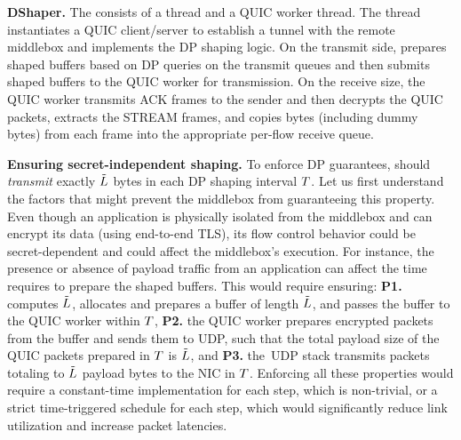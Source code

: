 \textbf{DShaper.}
%
The {\dshaper} consists of a {\prepare} thread and a QUIC
worker thread.
The {\prepare} thread instantiates a QUIC client/server to establish
a tunnel with the remote middlebox and implements the DP shaping logic.
On the transmit side, {\prepare} {prepares shaped buffers based on DP
queries on the transmit queues}
and then submits shaped buffers to the QUIC worker for transmission.
On the receive size, the QUIC worker transmits ACK frames to the sender
and then decrypts the QUIC packets, extracts the STREAM frames, and copies
bytes (including dummy bytes) from each frame into the appropriate per-flow
receive queue.

\textbf{Ensuring secret-independent shaping.}
To enforce DP guarantees, {\dshaper} should {\em transmit} exactly $\tilde{L}$
bytes in each DP shaping interval $T$.
%
Let us first understand the factors that might prevent the middlebox from
guaranteeing this property.
Even though an application is physically isolated from the middlebox and can
encrypt its data (\eg using end-to-end TLS), its flow control behavior could be
secret-dependent and could affect the middlebox's execution.
For instance, the presence or absence of payload traffic from an application
can affect the time {\dshaper} requires to prepare the shaped buffers.
\fi
%
This would require ensuring:
{\bf P1.} {\prepare} computes $\tilde{L}$, allocates and prepares a buffer
of length
$\tilde{L}$, and passes the buffer to the QUIC worker within $T$,
{\bf P2.} the QUIC worker prepares encrypted packets from the buffer and sends
them to UDP, such that the total payload size of the QUIC packets prepared in
$T$ is $\tilde{L}$, and
{\bf P3.} the~UDP stack transmits packets totaling to $\tilde{L}$ payload bytes
to the NIC in $T$.
Enforcing all these properties would require a constant-time implementation for
each step, which is non-trivial, or a strict time-triggered schedule
for each step, which would significantly reduce link utilization and increase
packet latencies.

